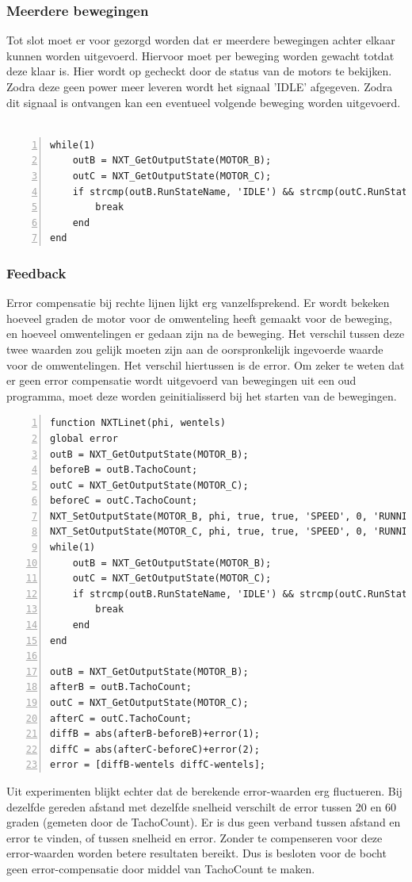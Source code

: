 \documentclass[a4paper]{article}
\begin{document}
\subsubsection{Meerdere bewegingen}
Tot slot moet er voor gezorgd worden dat er meerdere bewegingen achter elkaar kunnen worden uitgevoerd. Hiervoor moet per beweging worden gewacht totdat deze klaar is. Hier wordt op gecheckt door de status van de motors te bekijken. Zodra deze geen power meer leveren wordt het signaal 'IDLE' afgegeven. Zodra dit signaal is ontvangen kan een eventueel volgende beweging worden uitgevoerd.
\\\\
\begin{lstlisting}[caption=Meerdere moves, label=lst:moves, numbers=left]
while(1)
    outB = NXT_GetOutputState(MOTOR_B);
    outC = NXT_GetOutputState(MOTOR_C);
    if strcmp(outB.RunStateName, 'IDLE') && strcmp(outC.RunStateName, 'IDLE')
        break
    end
end
\end{lstlisting}
\subsubsection{Feedback}
Error compensatie bij rechte lijnen lijkt erg vanzelfsprekend. Er wordt bekeken hoeveel graden de motor voor de omwenteling heeft gemaakt voor de beweging, en hoeveel omwentelingen er gedaan zijn na de beweging. Het verschil tussen deze twee waarden zou gelijk moeten zijn aan de oorspronkelijk ingevoerde waarde voor de omwentelingen. Het verschil hiertussen is de error. Om zeker te weten dat er geen error compensatie wordt uitgevoerd van bewegingen uit een oud programma, moet deze worden geinitialisserd bij het starten van de bewegingen. 
\begin{lstlisting}[caption=Error compensatie bij een lijn, label=lst:lineerror, numbers=left]
function NXTLinet(phi, wentels)
global error
outB = NXT_GetOutputState(MOTOR_B);
beforeB = outB.TachoCount;
outC = NXT_GetOutputState(MOTOR_C);
beforeC = outC.TachoCount;
NXT_SetOutputState(MOTOR_B, phi, true, true, 'SPEED', 0, 'RUNNING', wentels-error(1), 'dontreply');
NXT_SetOutputState(MOTOR_C, phi, true, true, 'SPEED', 0, 'RUNNING', wentels-error(2), 'dontreply');
while(1)
    outB = NXT_GetOutputState(MOTOR_B);
    outC = NXT_GetOutputState(MOTOR_C);
    if strcmp(outB.RunStateName, 'IDLE') && strcmp(outC.RunStateName, 'IDLE')
        break
    end
end

outB = NXT_GetOutputState(MOTOR_B);
afterB = outB.TachoCount;
outC = NXT_GetOutputState(MOTOR_C);
afterC = outC.TachoCount;
diffB = abs(afterB-beforeB)+error(1);
diffC = abs(afterC-beforeC)+error(2);
error = [diffB-wentels diffC-wentels];

\end{lstlisting}
Uit experimenten blijkt echter dat de berekende error-waarden erg fluctueren. Bij dezelfde gereden afstand met dezelfde snelheid verschilt de error tussen 20 en 60 graden (gemeten door de TachoCount). Er is dus geen verband tussen afstand en error te vinden, of tussen snelheid en error. Zonder te compenseren voor deze error-waarden worden betere resultaten bereikt. Dus is besloten voor de bocht geen error-compensatie door middel van TachoCount te maken.
\end{document}
